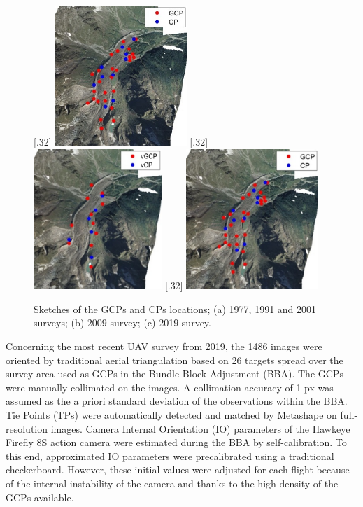 \begin{figure}
    \centering
    \subcaptionbox{\label{fig:2:gcp:historical}}[.32\textwidth]{
        \includegraphics[height=5.3cm]{gcp_historical}
    } \hspace{1mm}
    \subcaptionbox{\label{fig:2:gcp:2009}}[.32\textwidth]{
        \includegraphics[height=5.3cm]{gcp_2009}
    }
    \subcaptionbox{\label{fig:2:gcp:2019}}[.32\textwidth]{
        \includegraphics[height=5.3cm]{gcp_2019}
    } 
    \caption{Sketches of the GCPs and CPs locations; (a) 1977, 1991 and 2001 surveys; (b) 2009 survey; (c) 2019 survey.}
    \label{fig:2:gcp}
\end{figure}

Concerning the most recent UAV survey from 2019, the 1486 images were oriented by traditional aerial triangulation based on 26 targets spread over the survey
 area used as GCPs in the Bundle Block Adjustment (BBA).
The GCPs were manually collimated on the images.
A collimation accuracy of 1 px was assumed as the a priori standard deviation of the observations within the BBA. 
Tie Points (TPs) were automatically detected and matched by Metashape on full-resolution images.
Camera Internal Orientation (IO) parameters of the Hawkeye Firefly 8S action camera were
estimated during the BBA by self-calibration. 
To this end, approximated IO parameters were precalibrated using a traditional checkerboard. 
However, these initial values were adjusted for each flight because of the internal instability of the camera and thanks to the high density of the GCPs available.

